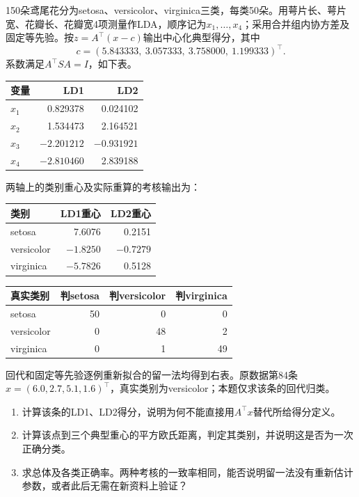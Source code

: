 150朵鸢尾花分为setosa、versicolor、virginica三类，每类50朵。用萼片长、萼片宽、花瓣长、花瓣宽4项测量作LDA，顺序记为$x_1,\ldots,x_4$；采用合并组内协方差及固定等先验。按$z=A^\top(x-c)$输出中心化典型得分，其中
\[
c=(5.843333,\ 3.057333,\ 3.758000,\ 1.199333)^\top.
\]
系数满足$A^\top SA=I$，如下表。
\begin{center}\small\begin{tabular}{lrr}\toprule
变量 & LD1 & LD2\\\midrule
$x_1$ & 0.829378 & 0.024102\\
$x_2$ & 1.534473 & 2.164521\\
$x_3$ & $-2.201212$ & $-0.931921$\\
$x_4$ & $-2.810460$ & 2.839188\\\bottomrule
\end{tabular}\end{center}
两轴上的类别重心及实际重算的考核输出为：
\begin{center}\small\begin{tabular}{lrr}\toprule
类别 & LD1重心 & LD2重心\\\midrule
setosa & 7.6076 & 0.2151\\
versicolor & $-1.8250$ & $-0.7279$\\
virginica & $-5.7826$ & 0.5128\\\bottomrule
\end{tabular}\qquad
\begin{tabular}{lrrr}\toprule
真实类别 & 判setosa & 判versicolor & 判virginica\\\midrule
setosa & 50 & 0 & 0\\
versicolor & 0 & 48 & 2\\
virginica & 0 & 1 & 49\\\bottomrule
\end{tabular}\end{center}
回代和固定等先验逐例重新拟合的留一法均得到右表。原数据第84条$x=(6.0,2.7,5.1,1.6)^\top$，真实类别为versicolor；本题仅求该条的回代归类。
\begin{enumerate}[label=（\arabic*）]
\item 计算该条的LD1、LD2得分，说明为何不能直接用$A^\top x$替代所给得分定义。
\item 计算该点到三个典型重心的平方欧氏距离，判定其类别，并说明这是否为一次正确分类。
\item 求总体及各类正确率。两种考核的一致率相同，能否说明留一法没有重新估计参数，或者此后无需在新资料上验证？
\end{enumerate}


